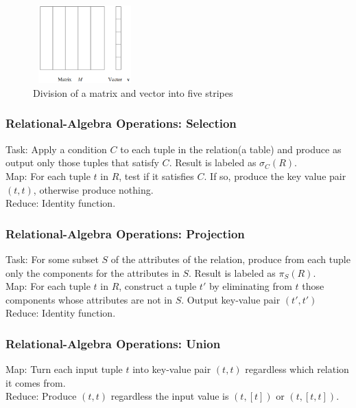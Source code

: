 \begin{figure}[h]
    \centering
    \includegraphics[width=4cm, height = 3cm]{figs/001_mat_vec_div.PNG}
    \caption{Division of a matrix and vector into five stripes}
    \label{fig:mat_vec_div}
\end{figure}

\subsubsection{Relational-Algebra Operations: Selection}
Task: Apply a condition $C$ to each tuple in the relation(a table) and produce as output only those tuples that satisfy $C$. Result is labeled as $\sigma_C(R)$. \\

Map: For each tuple $t$ in $R$, test if it satisfies $C$. If so, produce the key value pair $(t, t)$, otherwise produce nothing. \\

Reduce: Identity function. 

\subsubsection{Relational-Algebra Operations: Projection} 
Task: For some subset $S$ of the attributes of the relation, produce from each tuple only the components for the attributes in $S$. Result is labeled as $\pi_S(R)$.\\

Map: For each tuple $t$ in $R$, construct a tuple $t'$ by eliminating from $t$ those components whose attributes are not in $S$. Output key-value pair $(t', t')$\\

Reduce: Identity function. 

\subsubsection{Relational-Algebra Operations: Union}
Map: Turn each input tuple $t$ into key-value pair $(t,t)$ regardless which relation it comes from. \\

Reduce: Produce $(t, t)$ regardless the input value is $(t, [t])$ or $(t, [t, t])$. 

